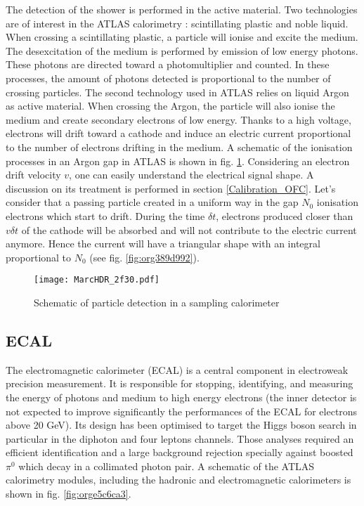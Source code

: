 The detection of the shower is performed in the active material.
Two technologies are of interest in the ATLAS calorimetry : scintillating plastic and noble liquid.
When crossing a scintillating plastic, a particle will ionise and excite the medium.
The desexcitation of the medium is performed by emission of low energy photons.
These photons are directed toward a photomultiplier and counted.
In these processes, the amount of photons detected is proportional to the number of crossing particles.
The second technology used in ATLAS relies on liquid Argon as active material.
When crossing the Argon, the particle will also ionise the medium and create secondary electrons of low energy.
Thanks to a high voltage, electrons will drift toward a cathode and induce an electric current proportional to the number of electrons drifting in the medium.
A schematic of the ionisation processes in an Argon gap in ATLAS is shown in fig. \ref{fig:org7afc547}.
Considering an electron drift velocity $v$, one can easily understand the electrical signal shape.
A discussion on its treatment is performed in section \ref{Calibration_OFC}.
Let's consider that a passing particle created in a uniform way in the gap $N_0$ ionisation electrons which start to drift.
During the time $\delta t$, electrons produced closer than $v\delta t$ of the cathode will be absorbed and will not contribute to the electric current anymore.
Hence the current will have a triangular shape with an integral proportional to $N_0$ (see fig. \ref{fig:org389d992}).


\begin{figure}[htbp]
\centering
\texttt{[image: MarcHDR\_2f30.pdf]}
\caption{\label{fig:org7afc547}
Schematic of particle detection in a sampling calorimeter}
\end{figure}

\subsection{ECAL}
\label{sec:org1c46fb6}

The electromagnetic calorimeter (ECAL) is a central component in electroweak precision measurement.
It is responsible for stopping, identifying, and measuring the energy of photons and medium to high energy electrons (the inner detector is not expected to improve significantly the performances of the ECAL for electrons above 20 GeV).
Its design has been optimised to target the Higgs boson search in particular in the diphoton and four leptons channels.
Those analyses required an efficient identification and a large background rejection specially against boosted $\pi^0$ which decay in a collimated photon pair.
A schematic of the ATLAS calorimetry modules, including the hadronic and electromagnetic calorimeters is shown in fig. \ref{fig:orge5c6ca3}.


